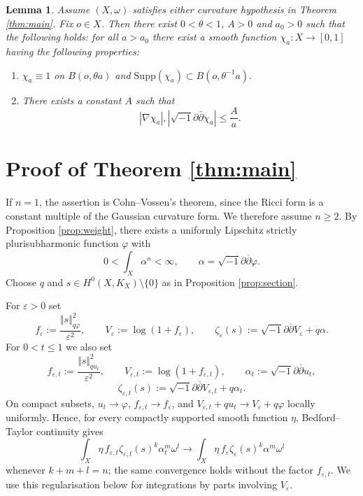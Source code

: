 \documentclass[11pt]{amsart}
\numberwithin{equation}{section}
\newcommand{\ddc}{\sqrt{-1}\partial\bar\partial}
\newcommand{\vep}{\varepsilon}
\renewcommand{\d}{\partial}
\newcommand{\ddbar}{\sqrt{-1}\d\overline{\d}}
\theoremstyle{plain}
\newtheorem{lemma}[theorem]{Lemma}
\theoremstyle{remark}
\begin{document}
\begin{lemma}\label{lem:cut-off}
Assume $(X,\omega)$ satisfies either curvature hypothesis in Theorem \ref{thm:main}. Fix $o\in X$. Then there exist $0< \theta < 1$, $A>0$ and $a_0>0$ such that the following holds: for all $a>a_0$ there exist a smooth function $\chi_a:X\rightarrow [0,1]$ having the following properties:
\begin{enumerate}
\item $\chi_a \equiv 1$ on $B(o,\theta a)$ and $\mathrm{Supp}(\chi_a)\subset B(o,\theta^{-1}a).$
\item There exists a constant $A$ such that $$|\nabla \chi_a|, |\ddc \chi_a| \leq \frac{A}{a}. $$
\end{enumerate}
\end{lemma}


















\section{Proof of Theorem \ref{thm:main}} \label{sec:proof}

If $n=1$, the assertion is Cohn--Vossen's theorem, since the Ricci form is a constant multiple of the Gaussian curvature form.  We therefore assume $n\geq2$.
By Proposition \ref{prop:weight}, there exists a uniformly Lipschitz strictly plurisubharmonic function $\varphi$ with
\[
       0< \int_X\alpha^n<\infty,
        \qquad \alpha=\ddbar\varphi .
\]
Choose $q$ and $s\in H^0(X,K_X)\setminus\{0\}$ as in Proposition \ref{prop:section}.

For $\vep>0$ set
\[
        f_\vep:=\frac{\Vert s\Vert_{q\varphi}^2}{\vep^2},\qquad
        V_\vep:=\log(1+f_\vep),\qquad
        \zeta_\vep(s):=\ddbar V_\vep+q\alpha .
\]
For $0<t\leq1$ we also set
\[
        f_{\vep,t}:=\frac{\Vert s\Vert_{q u_t}^2}{\vep^2},\qquad
        V_{\vep,t}:=\log(1+f_{\vep,t}),\qquad
        \alpha_t:=\ddbar u_t,
\]
\[
        \zeta_{\vep,t}(s):=\ddbar V_{\vep,t}+q\alpha_t .
\]
On compact subsets, $u_t\to\varphi$, $f_{\vep,t}\to f_\vep$, and
$V_{\vep,t}+qu_t\to V_\vep+q\varphi$ locally uniformly.  Hence, for every compactly supported smooth function $\eta$, Bedford--Taylor continuity gives
\begin{equation}\label{eq:BT-convention}
\int_X \eta\, f_{\vep,t}\zeta_{\vep,t}(s)^k\alpha_t^m\omega^l
\longrightarrow
\int_X \eta\, f_\vep\zeta_\vep(s)^k\alpha^m\omega^l
\end{equation}
whenever $k+m+l=n$; the same convergence holds without the factor $f_{\vep,t}$.  We use this regularisation below for integrations by parts involving $V_\vep$.
\end{document}
